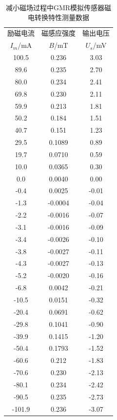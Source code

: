 \documentclass{thuemp}
\begin{document}
\begin{itemize}
\begin{table}[H]
    \centering
    \captionnamefont{\wuhao\bf\heiti}
    \captiontitlefont{\wuhao\bf\heiti}
    \caption{减小磁场过程中GMR模拟传感器磁电转换特性测量数据} \label{tab:gmrsensor_desc}
    \liuhao
    \begin{tabular}{ccc}
        \toprule
        励磁电流 & 磁感应强度 & 输出电压  \\
        $I_m$/\si{\milli\ampere} & $B$/\si{\milli\tesla} & $U_s$/\si{\milli\volt} \\
        \midrule
        100.5  & 0.236    &  3.03 \\
        89.6   & 0.235    &  2.70 \\
        80.0   & 0.234    &  2.41 \\
        69.8   & 0.230    &  2.11 \\
        59.9   & 0.213    &  1.81 \\
        50.2   & 0.184    &  1.51 \\
        40.7   & 0.151    &  1.23 \\
        29.5   & 0.1089   &  0.89 \\
        19.7   & 0.0710   &  0.59 \\
        10.0   & 0.0365   &  0.30 \\
        0.0    & 0.0040   &  0.00 \\
        -0.4   & 0.0025   & -0.01 \\
        -1.3   & -0.0004  & -0.04 \\
        -2.2   & -0.0016  & -0.07 \\
        -3.1   & -0.0016  & -0.09 \\
        -3.4   & -0.0026  & -0.10 \\
        -3.8   & -0.0027  & -0.11 \\
        -4.3   & -0.0027  & -0.13 \\
        -5.2   & -0.0020  & -0.16 \\
        -6.8   & 0.0042   & -0.21 \\
        -10.5  & 0.0151   & -0.32 \\
        -20.4  & 0.0691   & -0.62 \\
        -29.8  & 0.1041   & -0.90 \\
        -39.9  & 0.1415   & -1.20 \\
        -50.4  & 0.1793   & -1.52 \\
        -60.6  & 0.212    & -1.83 \\
        -70.6  & 0.230    & -2.13 \\
        -80.1  & 0.234    & -2.42 \\
        -90.5  & 0.235    & -2.73 \\
        -101.9 & 0.236    & -3.07 \\
        \bottomrule
    \end{tabular}
\end{table}


\end{itemize}
\end{document}
